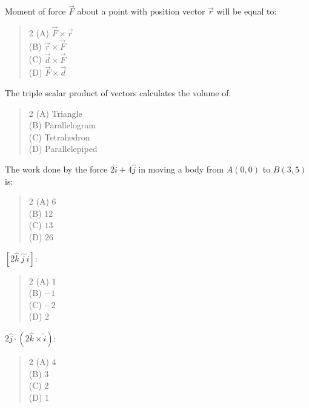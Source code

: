 \documentclass[11pt,a4paper]{article}
\begin{document}
\begin{mcqlist}
\item Moment of force $\vec{F}$ about a point with position vector $\vec{r}$ will be equal to:
\begin{quote}\begin{multicols}{2}
\noindent (A) $\vec{F}\times\vec{r}$ \\
(B) $\vec{r}\times\vec{F}$ \\
(C) $\vec{d}\times\vec{F}$ \\
(D) $\vec{F}\times\vec{d}$
\end{multicols}\end{quote}

\item The triple scalar product of vectors calculates the volume of:
\begin{quote}\begin{multicols}{2}
\noindent (A) Triangle \\
(B) Parallelogram \\
(C) Tetrahedron \\
(D) Parallelepiped
\end{multicols}\end{quote}

\item The work done by the force $2\hat{i}+4\hat{j}$ in moving a body from $A(0,0)$ to $B(3,5)$ is:
\begin{quote}\begin{multicols}{2}
\noindent (A) $6$ \\
(B) $12$ \\
(C) $13$ \\
(D) $26$
\end{multicols}\end{quote}

\item $[2\hat{k}\ \hat{j}\ \hat{i}]$:
\begin{quote}\begin{multicols}{2}
\noindent (A) $1$ \\
(B) $-1$ \\
(C) $-2$ \\
(D) $2$
\end{multicols}\end{quote}

\item $2\hat{j}\cdot(2\hat{k}\times\hat{i})$:
\begin{quote}\begin{multicols}{2}
\noindent (A) $4$ \\
(B) $3$ \\
(C) $2$ \\
(D) $1$
\end{multicols}\end{quote}


\end{mcqlist}
\end{document}
